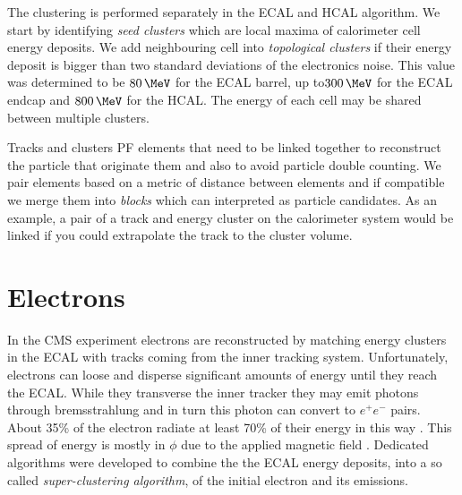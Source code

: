 The clustering is performed separately in the \gls{ECAL} and \gls{HCAL} algorithm. We start by identifying \textit{seed clusters} which are local maxima of calorimeter cell energy deposits. We add neighbouring cell into \textit{topological clusters} if their energy deposit is bigger than two standard deviations of the electronics noise. This value was determined to be $80\,\MeV$ for the \gls{ECAL} barrel, up to$300\,\MeV$ for the \gls{ECAL} endcap and $800\,\MeV$ for the \gls{HCAL}. The energy of each cell may be shared between multiple clusters.

Tracks and clusters \gls{PF} elements that need to be linked together to reconstruct the particle that originate them and also to avoid particle double counting. We pair elements based on a metric of distance between elements and if compatible we merge them into \textit{blocks} which can interpreted as particle candidates. As an example, a pair of a track and energy cluster on the calorimeter system would be linked if you could extrapolate the track to the cluster volume.


\section{Electrons}
\label{SECTION:EventReconstructionPhysicsObjects_Electrons}


In the \gls{CMS} experiment electrons are reconstructed by matching energy clusters in the \gls{ECAL} with tracks coming from the inner tracking system. Unfortunately, electrons can loose and disperse significant amounts of energy until they reach the \gls{ECAL}. While they transverse the inner tracker they may emit photons through bremsstrahlung and in turn this photon can convert to $e^+e^-$ pairs. About 35\% of the electron radiate at least 70\% of their energy in this way \cite{ARTICLE:CMSElectronReconstruction}. This spread of energy is mostly in $\phi$ due to the applied magnetic field \cite{ARTICLE:CMSElectronReconstructionECAL}. Dedicated algorithms were developed to combine the the \gls{ECAL} energy deposits, into a so called \textit{super-clustering algorithm}, of the initial electron and its emissions.


